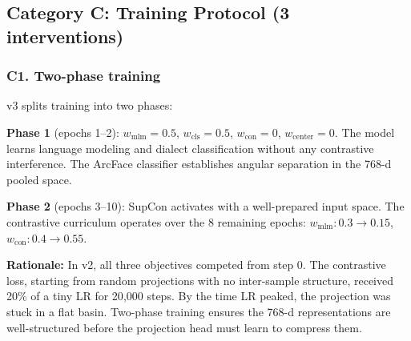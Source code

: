 \documentclass[11pt,a4paper]{article}
\begin{document}
\subsection{Category C: Training Protocol (3 interventions)}

\subsubsection{C1. Two-phase training}

v3 splits training into two phases:

\begin{center}
\end{center}

\textbf{Phase 1} (epochs 1--2): $w_{\text{mlm}} = 0.5$, $w_{\text{cls}} = 0.5$,
$w_{\text{con}} = 0$, $w_{\text{center}} = 0$. The model learns language modeling
and dialect classification without any contrastive interference. The ArcFace
classifier establishes angular separation in the 768-d pooled space.

\textbf{Phase 2} (epochs 3--10): SupCon activates with a well-prepared input
space. The contrastive curriculum operates over the 8 remaining epochs:
$w_{\text{mlm}}: 0.3 \to 0.15$, $w_{\text{con}}: 0.4 \to 0.55$.

\textbf{Rationale:} In v2, all three objectives competed from step 0. The
contrastive loss, starting from random projections with no inter-sample
structure, received 20\% of a tiny LR for 20{,}000 steps. By the time LR
peaked, the projection was stuck in a flat basin. Two-phase training ensures
the 768-d representations are well-structured before the projection head must
learn to compress them.
\end{document}

